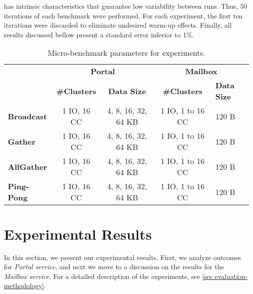 			\mppa has intrinsic characteristics that guarantee low variability
			between runs. Thus, 50 iterations of each benchmark were performed.
			For each experiment, the first ten iterations were discarded to
			eliminate undesired warm-up effects. Finally, all results discussed
			bellow present a standard error inferior to 1\%.

			\begin{table}[!tb]
				\centering%
				\caption{Micro-benchmark parameters for experiments.}%
				\label{tab:benchmarks-parameters}%

				\begin{tabular}{l|c|c|c|l|}
					\cline{2-5}
															 & \multicolumn{2}{c|}{\textbf{Portal}}      & \multicolumn{2}{c|}{\textbf{Mailbox}}    \\ \cline{2-5}
															 & \textbf{\#Clusters} & \textbf{Data Size}  & \textbf{\#Clusters} & \textbf{Data Size} \\ \hline
					\multicolumn{1}{|l|}{\textbf{Broadcast}} & 1 IO, 16 CC         & 4, 8, 16, 32, 64 KB & 1 IO, 1 to 16 CC    & 120 B              \\ \hline
					\multicolumn{1}{|l|}{\textbf{Gather}}    & 1 IO, 16 CC         & 4, 8, 16, 32, 64 KB & 1 IO, 1 to 16 CC    & 120 B              \\ \hline
					\multicolumn{1}{|l|}{\textbf{AllGather}} & 1 IO, 16 CC         & 4, 8, 16, 32, 64 KB & 1 IO, 1 to 16 CC    & 120 B              \\ \hline
					\multicolumn{1}{|l|}{\textbf{Ping-Pong}} & 1 IO, 16 CC         & 4, 8, 16, 32, 64 KB & 1 IO, 1 to 16 CC    & 120 B              \\ \hline
				\end{tabular}

			\end{table}

	\section{Experimental Results}
	\label{sec.experimental-results}

		In this section, we present our experimental results. First, we
		analyze outcomes for \textit{Portal service}, and next we move to
		a discussion on the results for the \textit{Mailbox service}. For
		a detailed description of the experiments, see \autoref{sec.evaluation-methodology}.

